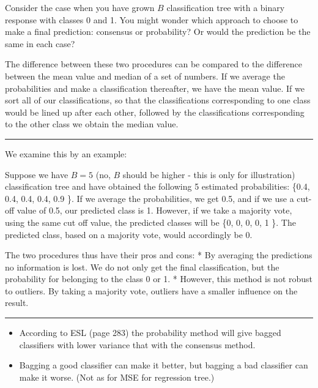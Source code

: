 \documentclass[
  letterpaper,
  DIV=11,
  numbers=noendperiod]{scrartcl}
\begin{document}
Consider the case when you have grown \(B\) classification tree with a
binary response with classes 0 and 1. You might wonder which approach to
choose to make a final prediction: consensus or probability? Or would
the prediction be the same in each case?

The difference between these two procedures can be compared to the
difference between the mean value and median of a set of numbers. If we
average the probabilities and make a classification thereafter, we have
the mean value. If we sort all of our classifications, so that the
classifications corresponding to one class would be lined up after each
other, followed by the classifications corresponding to the other class
we obtain the median value.

\begin{center}\rule{0.5\linewidth}{0.5pt}\end{center}

We examine this by an example:

Suppose we have \(B=5\) (no, \(B\) should be higher - this is only for
illustration) classification tree and have obtained the following 5
estimated probabilities: \{0.4, 0.4, 0.4, 0.4, 0.9 \}. If we average the
probabilities, we get 0.5, and if we use a cut-off value of 0.5, our
predicted class is 1. However, if we take a majority vote, using the
same cut off value, the predicted classes will be \{0, 0, 0, 0, 1 \}.
The predicted class, based on a majority vote, would accordingly be 0.

The two procedures thus have their pros and cons: * By averaging the
predictions no information is lost. We do not only get the final
classification, but the probability for belonging to the class 0 or 1. *
However, this method is not robust to outliers. By taking a majority
vote, outliers have a smaller influence on the result.

\begin{center}\rule{0.5\linewidth}{0.5pt}\end{center}

\begin{itemize}
\item
  According to ESL (page 283) the probability method will give bagged
  classifiers with lower variance that with the consensus method.
\item
  Bagging a good classifier can make it better, but bagging a bad
  classifier can make it worse. (Not as for MSE for regression tree.)
\end{itemize}
\end{document}
